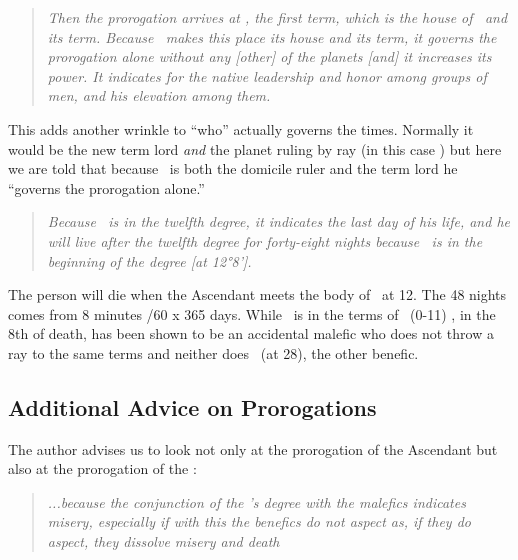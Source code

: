 \begin{quote}
\textsl{Then the prorogation arrives at \Sagittarius, the first term, which is the house of \Jupiter\, and its term. Because \Jupiter\, makes this place its house and its term, it governs the prorogation alone without any [other] of the planets [and] it increases its power. It indicates for the native leadership and honor among groups of men, and his elevation among them.}
\end{quote}

This adds another wrinkle to ``who'' actually governs the times. Normally it would be the new term lord \textsl{and} the planet ruling by ray (in this case \Venus) but here we are told that because \Jupiter\, is both the domicile ruler and the term lord he ``governs the prorogation alone.''

\begin{quote}
\textsl{Because \Saturn\, is in the twelfth degree, it indicates the last day of his life, and he will live after the twelfth degree for forty-eight nights because \Saturn\, is in the beginning of the degree [at 12°8'].}
\end{quote}

The person will die when the Ascendant meets the body of \Saturn\, at 12\Sagittarius. The 48 nights comes from 8 minutes /60 x 365 days. While \Saturn\, is in the terms of \Jupiter\, (0-11\Sagittarius) \Jupiter, in the 8th of death, has been shown to be an accidental malefic who does not throw a ray to the same terms and neither does \Venus\, (at 28\Leo), the other benefic.

\subsection{Additional Advice on Prorogations}
The author advises us to look not only at the prorogation of the Ascendant but also at the prorogation of the \Moon:
\begin{quote}
\textsl{...because the conjunction of the \Moon's degree with the malefics indicates misery, especially if with this the benefics do not aspect as, if they do aspect, they dissolve misery and death}
\end{quote}

